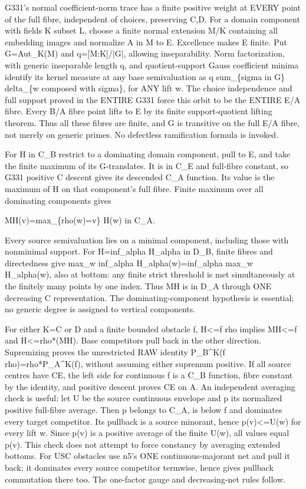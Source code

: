 \documentclass[11pt]{article}
\begin{document}
G331's normal coefficient-norm trace has a finite positive weight at EVERY point of the full fibre, independent of choices, preserving C,D. For a domain component with fields K subset L, choose a finite normal extension M/K containing all embedding images and normalize A in M to E. Excellence makes E finite. Put G=Aut\_K(M) and q=[M:K]/|G|, allowing inseparability. Norm factorization, with generic inseparable length q, and quotient-support Gauss coefficient minima identify its kernel measure at any base semivaluation as q sum\_\{sigma in G\} delta\_\{w composed with sigma\}, for ANY lift w. The choice independence and full support proved in the ENTIRE G331 force this orbit to be the ENTIRE E/A fibre. Every B/A fibre point lifts to E by its finite support-quotient lifting theorem. Thus all these fibres are finite, and G is transitive on the full E/A fibre, not merely on generic primes. No defectless ramification formula is invoked.

For H in C\_B restrict to a dominating domain component, pull to E, and take the finite maximum of its G-translates. It is in C\_E and full-fibre constant, so G331 positive C descent gives its descended C\_A function. Its value is the maximum of H on that component's full fibre. Finite maximum over all dominating components gives

    MH(v)=max\_\{rho(w)=v\} H(w) in C\_A.

Every source semivaluation lies on a minimal component, including those with nonminimal support. For H=inf\_alpha H\_alpha in D\_B, finite fibres and directedness give max\_w inf\_alpha H\_alpha(w)=inf\_alpha max\_w H\_alpha(w), also at bottom: any finite strict threshold is met simultaneously at the finitely many points by one index. Thus MH is in D\_A through ONE decreasing C representation. The dominating-component hypothesis is essential; no generic degree is assigned to vertical components.

For either K=C or D and a finite bounded obstacle f, H<=f rho implies MH<=f and H<=rho*(MH). Base competitors pull back in the other direction. Supremizing proves the unrestricted RAW identity P\_B\textasciicircum{}K(f rho)=rho*P\_A\textasciicircum{}K(f), without assuming either supremum positive. If all source centres have CE, the left side for continuous f is a C\_B function, fibre constant by the identity, and positive descent proves CE on A. An independent averaging check is useful: let U be the source continuous envelope and p its normalized positive full-fibre average. Then p belongs to C\_A, is below f and dominates every target competitor. Its pullback is a source minorant, hence p(v)<=U(w) for every lift w. Since p(v) is a positive average of the finite U(w), all values equal p(v). This check does not attempt to force constancy by averaging extended bottoms. For USC obstacles use n5's ONE continuous-majorant net and pull it back; it dominates every source competitor termwise, hence gives pullback commutation there too. The one-factor gauge and decreasing-net rules follow.
\end{document}
